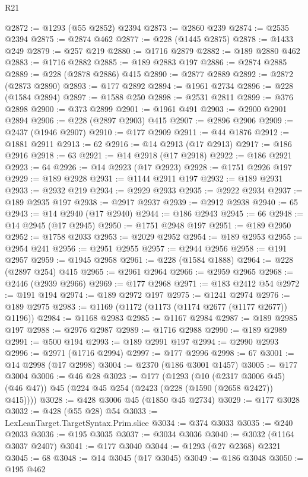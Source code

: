 \begin{lexlean}{R21}
\begin{coremodule}
@2872 := @1293 (@55 @2852) @2394
@2873 := @2860 @239
@2874 := @2535 @2394
@2875 := @2874 @462
@2877 := @228 (@1445 @2875)
@2878 := @1433 @249
@2879 := @257 @219
@2880 := @1716 @2879
@2882 := @189 @2880 @462
@2883 := @1716 @2882
@2885 := @189 @2883 @197
@2886 := @2874 @2885
@2889 := @228 (@2878 @2886) @415
@2890 := @2877 @2889
@2892 := @2872 (@2873 @2890)
@2893 := @177 @2892
@2894 := @1961 @2734
@2896 := @228 (@1584 @2894)
@2897 := @1588 @250
@2898 := @2531 @2811
@2899 := @376 @2898
@2900 := @373 @2899
@2901 := @1961 @491
@2903 := @2900 @2901 @2894
@2906 := @228 (@2897 @2903) @415
@2907 := @2896 @2906
@2909 := @2437 (@1946 @2907)
@2910 := @177 @2909
@2911 := @44 @1876
@2912 := @1881 @2911
@2913 := 62
@2916 := @14 @2913 (@17 @2913)
@2917 := @186 @2916
@2918 := 63
@2921 := @14 @2918 (@17 @2918)
@2922 := @186 @2921
@2923 := 64
@2926 := @14 @2923 (@17 @2923)
@2928 := @1751 @2926 @197
@2929 := @189 @2928
@2931 := @1144 @2911 @197
@2932 := @189 @2931
@2933 := @2932 @219
@2934 := @2929 @2933
@2935 := @2922 @2934
@2937 := @189 @2935 @197
@2938 := @2917 @2937
@2939 := @2912 @2938
@2940 := 65
@2943 := @14 @2940 (@17 @2940)
@2944 := @186 @2943
@2945 := 66
@2948 := @14 @2945 (@17 @2945)
@2950 := @1751 @2948 @197
@2951 := @189 @2950
@2952 := @1758 @2033
@2953 := @2029 @2952
@2954 := @189 @2953
@2955 := @2954 @241
@2956 := @2951 @2955
@2957 := @2944 @2956
@2958 := @191 @2957
@2959 := @1945 @2958
@2961 := @228 (@1584 @1888)
@2964 := @228 (@2897 @254) @415
@2965 := @2961 @2964
@2966 := @2959 @2965
@2968 := @2446 (@2939 @2966)
@2969 := @177 @2968
@2971 := @183 @2412 @54
@2972 := @191 @194
@2974 := @189 @2972 @197
@2975 := @1241 @2974
@2976 := @189 @2975
@2983 := @1169 (@1172 (@1173 (@1174 @2677 (@1177 @2677)) @1196))
@2984 := @1168 @2983
@2985 := @1167 @2984
@2987 := @189 @2985 @197
@2988 := @2976 @2987
@2989 := @1716 @2988
@2990 := @189 @2989
@2991 := @500 @194
@2993 := @189 @2991 @197
@2994 := @2990 @2993
@2996 := @2971 (@1716 @2994)
@2997 := @177 @2996
@2998 := 67
@3001 := @14 @2998 (@17 @2998)
@3004 := @2370 (@186 @3001 @1457)
@3005 := @177 @3004
@3006 := @46 @28
@3023 := @177
    (@1293
      (@10 (@2317 @3006 @45) (@46 @47))
      @45
      (@224 @45 @254 (@2423 (@228 (@1590 (@2658 @2427)) @415))))
@3028 := @428 @3006 @45 (@1850 @45 @2734)
@3029 := @177 @3028
@3032 := @428 (@55 @28) @54
@3033 := LexLeanTarget.TargetSyntax.Prim.slice
@3034 := @374 @3033
@3035 := @240 @2033
@3036 := @195 @3035
@3037 := @3034 @3036
@3040 := @3032 (@1164 @3037 @2407)
@3041 := @177 @3040
@3044 := @1293 (@27 @2368) @2321
@3045 := 68
@3048 := @14 @3045 (@17 @3045)
@3049 := @186 @3048
@3050 := @195 @462

\end{coremodule}
\end{lexlean}
